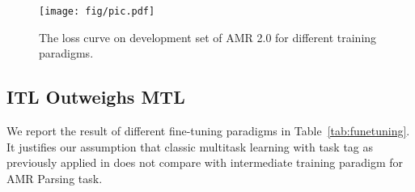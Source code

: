 \documentclass[11pt]{article}
\begin{document}
 \begin{table}[t]
    \centering
{}
    \caption{Analysis on Training Paradigms. Intermediate-task training is more suitable for AMR parsing than Multitask training}

    \label{tab:funetuning}
\end{table} 
\begin{figure}[t]
    \centering
    \texttt{[image:  fig/pic.pdf]}
    \caption{The loss curve on development set of AMR 2.0 for different training paradigms.}
    
    \label{fig:training-curve}
\end{figure}





\subsection{ITL Outweighs MTL}





We report the result of different fine-tuning paradigms in Table~\ref{tab:funetuning}. It justifies our assumption that classic multitask learning with task tag as previously applied in \citet{xu-seqpretrain,Damonte2021OneSP} does not compare with intermediate training paradigm for AMR Parsing task.
\end{document}

